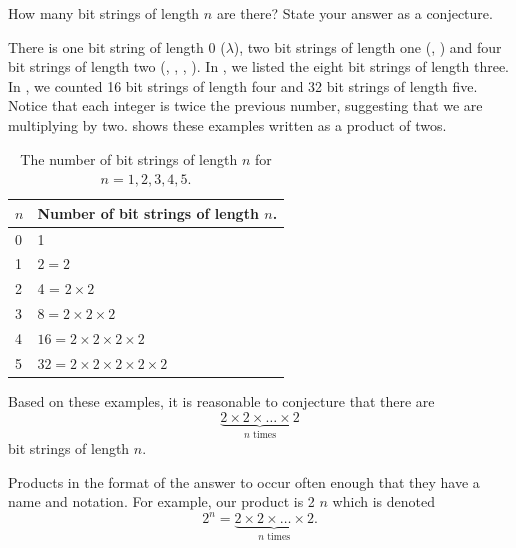\begin{exam} 
\label{exam_conjecture_number_bit_strings}
    How many bit strings of length $n$ are there?  State your answer as a conjecture.
    \begin{soln}
        There is one bit string of length 0 ($\lambda$), two bit strings of length one (, ) and four bit strings of length two (, , , ).  In , we listed the eight bit strings of length three.  In , we counted 16 bit strings of length four and 32 bit strings of length five. Notice that each integer is twice the previous number, suggesting that we are multiplying by two.   shows these examples written as a product of twos.
        
        \begin{table}[htbp]   
            \centering
            \begin{tabular}{l|l}
                $n$ & Number of bit strings of length $n$. \\ \hline
                0 & 1 \\ \hline
                1 & $2 = 2$ \\ \hline
                2 & 4 = $2 \times 2$ \\ \hline
                3 & $8 = 2 \times 2 \times 2$ \\ \hline
                4 & $16 = 2 \times 2 \times 2 \times 2$ \\ \hline
                5 & $32 = 2 \times 2 \times 2 \times 2 \times 2$ \\ 
            \end{tabular}
        \caption{The number of bit strings of length $n$ for $n=1,2,3,4,5$.}       
        \label{table_number_bit_strings}
        \end{table}
        Based on these examples, it is reasonable to conjecture that there are 
        $$\underbrace{2 \times 2 \times \ldots \times 2}_{n \text{ times}}$$
        bit strings of length $n$. 
    \end{soln}   
\end{exam}

Products in the format of the answer to  occur often enough that they have a name and notation.  
For example, our product is 2  $n$ which is denoted 
    $$2^n=
    \underbrace{2\times 2 \times \ldots \times 2}
    _{n \text{ times}}.$$
 
